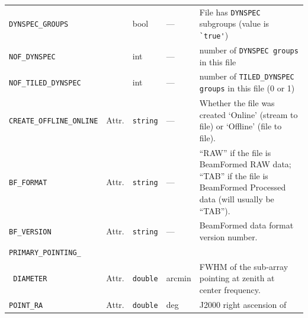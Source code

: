\documentclass[a4paper,10pt,bibtotoc]{scrartcl}
\begin{document}
{}
\tablelasttail{\hline}
\begin{supertabular}{|llllp{5cm}|}
  \hline
  \hline
  \small{\verb|DYNSPEC_GROUPS|}        && bool   &---& 
  	File has \texttt{DYNSPEC} subgroups (value is \verb|`true'|) \\
  \small{\verb|NOF_DYNSPEC|}          && int      &             ---            &
  	number of \texttt{DYNSPEC groups} in this file \\
  \small{\verb|NOF_TILED_DYNSPEC|}          && int      &             ---            & 
  	number of \texttt{TILED\_DYNSPEC groups} in this file (0 or 1)\\  \small{\verb|CREATE_OFFLINE_ONLINE|} & Attr. & \verb|string| & --- & Whether the file was created `Online' (stream to file) or
  `Offline' (file to file). \\
  \small{\verb|BF_FORMAT|} & Attr. & \verb|string| & --- & ``RAW'' if the file is BeamFormed RAW data; ``TAB'' if the
 file is BeamFormed Processed data (will usually be ``TAB'').  \\
  \small{\verb|BF_VERSION|} & Attr. & \verb|string| & --- & BeamFormed data format version number.\\  
  \small{\verb|PRIMARY_POINTING_|} &  &  & & \\
  \small{\verb| DIAMETER|} & Attr. & \verb|double| & arcmin & FWHM of the
  sub-array pointing at zenith at center frequency. \\
  \small{\verb|POINT_RA|} & Attr. & \verb|double| & deg & J2000 right ascension of

\end{supertabular}
\end{document}
